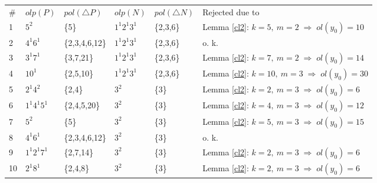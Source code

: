 {{\begin{flushleft}
\small{
\begin{tabular}{||l|l|l|l|l|l||}      \hline
  $\# $    &$ olp(P) $             & $pol(\triangle P) $     &$olp(N)$           &$pol(\triangle N)$       &  Rejected due to \\ \cline{1-6}
    1      & $5^{2}$               & {\scriptsize \{5\} }    & $1^{1}2^{1}3^{1}$ & {\scriptsize \{2,3,6\}} &  {\scriptsize Lemma \ref{cl2}: $k=5, \ m=2 \; {\Rightarrow} \; ol(y_{0})=10$}    \\ \hline 
    2      & $4^{1}6^{1}$          & {\scriptsize \{2,3,4,6,12\}}& $1^{1}2^{1}3^{1}$ & {\scriptsize \{2,3,6\}}                        & {\scriptsize o. k.} \\ \hline 
    3      & $3^{1}7^{1}$          & {\scriptsize \{3,7,21\}}& $1^{1}2^{1}3^{1}$ & {\scriptsize \{2,3,6\}} & {\scriptsize Lemma \ref{cl2}: $k=7, \ m=2 \; {\Rightarrow} \; ol(y_{0})=14$} \\ \hline 
    4      & $10^{1}$              & {\scriptsize \{2,5,10\}}& $1^{1}2^{1}3^{1}$ & {\scriptsize \{2,3,6\}} & {\scriptsize Lemma \ref{cl2}: $k=10, \ m=3 \; {\Rightarrow} \; ol(y_{0})=30$} \\ \hline 
    5      & $2^{1}4^{2}$          & {\scriptsize \{2,4\}}   & $3^{2}$           & {\scriptsize \{3\}}     & {\scriptsize Lemma \ref{cl2}: $k=2, \ m=3 \; {\Rightarrow} \; ol(y_{0})=6$} \\ \hline 
    6      & $1^{1}4^{1}5^{1}$     &{\scriptsize \{2,4,5,20\}}& $3^{2}$           & {\scriptsize \{3\}}     & {\scriptsize Lemma \ref{cl2}: $k=4, \ m=3 \; {\Rightarrow} \; ol(y_{0})=12$} \\ \hline 
    7      & $5^{2}$               & {\scriptsize \{5\}}      & $3^{2}$           & {\scriptsize \{3\}}     & {\scriptsize Lemma \ref{cl2}: $k=5, \ m=3 \; {\Rightarrow} \; ol(y_{0})=15$} \\ \hline 
    8      & $4^{1}6^{1}$          & {\scriptsize \{2,3,4,6,12\}}& $3^{2}$           & {\scriptsize \{3\}}                        &  {\scriptsize o. k.}    \\ \hline 
    9      & $1^{1}2^{1}7^{1}$     & {\scriptsize \{2,7,14\}} & $3^{2}$           & {\scriptsize \{3\}}     & {\scriptsize Lemma \ref{cl2}: $k=2, \ m=3 \; {\Rightarrow} \; ol(y_{0})=6$} \\ \hline 
    10     & $2^{1}8^{1}$          & {\scriptsize \{2,4,8\}}  & $3^{2}$           & {\scriptsize \{3\}}     & {\scriptsize Lemma \ref{cl2}: $k=2, \ m=3 \; {\Rightarrow} \; ol(y_{0})=6$} \\ \hline 

\end{tabular}}
\end{flushleft}}}
